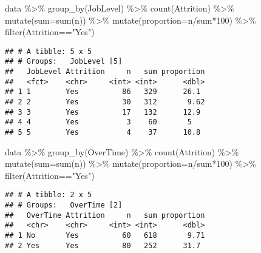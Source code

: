 \documentclass[
]{article}
\newenvironment{Shaded}{\begin{snugshade}}{\end{snugshade}}
\newcommand{\AttributeTok}[1]{\textcolor[rgb]{0.77,0.63,0.00}{#1}}
\newcommand{\DecValTok}[1]{\textcolor[rgb]{0.00,0.00,0.81}{#1}}
\newcommand{\FunctionTok}[1]{\textcolor[rgb]{0.00,0.00,0.00}{#1}}
\newcommand{\NormalTok}[1]{#1}
\newcommand{\SpecialCharTok}[1]{\textcolor[rgb]{0.00,0.00,0.00}{#1}}
\newcommand{\StringTok}[1]{\textcolor[rgb]{0.31,0.60,0.02}{#1}}
\begin{document}
\begin{Shaded}
\begin{Highlighting}[]
\NormalTok{data }\SpecialCharTok{\%\textgreater{}\%} \FunctionTok{group\_by}\NormalTok{(JobLevel) }\SpecialCharTok{\%\textgreater{}\%} 
  \FunctionTok{count}\NormalTok{(Attrition) }\SpecialCharTok{\%\textgreater{}\%} 
  \FunctionTok{mutate}\NormalTok{(}\AttributeTok{sum=}\FunctionTok{sum}\NormalTok{(n)) }\SpecialCharTok{\%\textgreater{}\%} 
  \FunctionTok{mutate}\NormalTok{(}\AttributeTok{proportion=}\NormalTok{n}\SpecialCharTok{/}\NormalTok{sum}\SpecialCharTok{*}\DecValTok{100}\NormalTok{) }\SpecialCharTok{\%\textgreater{}\%} 
  \FunctionTok{filter}\NormalTok{(Attrition}\SpecialCharTok{==}\StringTok{"Yes"}\NormalTok{)}
\end{Highlighting}
\end{Shaded}

\begin{verbatim}
## # A tibble: 5 x 5
## # Groups:   JobLevel [5]
##   JobLevel Attrition     n   sum proportion
##   <fct>    <chr>     <int> <int>      <dbl>
## 1 1        Yes          86   329      26.1 
## 2 2        Yes          30   312       9.62
## 3 3        Yes          17   132      12.9 
## 4 4        Yes           3    60       5   
## 5 5        Yes           4    37      10.8
\end{verbatim}

\begin{Shaded}
\begin{Highlighting}[]
\NormalTok{data }\SpecialCharTok{\%\textgreater{}\%} \FunctionTok{group\_by}\NormalTok{(OverTime) }\SpecialCharTok{\%\textgreater{}\%} 
  \FunctionTok{count}\NormalTok{(Attrition) }\SpecialCharTok{\%\textgreater{}\%} 
  \FunctionTok{mutate}\NormalTok{(}\AttributeTok{sum=}\FunctionTok{sum}\NormalTok{(n)) }\SpecialCharTok{\%\textgreater{}\%} 
  \FunctionTok{mutate}\NormalTok{(}\AttributeTok{proportion=}\NormalTok{n}\SpecialCharTok{/}\NormalTok{sum}\SpecialCharTok{*}\DecValTok{100}\NormalTok{) }\SpecialCharTok{\%\textgreater{}\%} 
  \FunctionTok{filter}\NormalTok{(Attrition}\SpecialCharTok{==}\StringTok{"Yes"}\NormalTok{)}
\end{Highlighting}
\end{Shaded}

\begin{verbatim}
## # A tibble: 2 x 5
## # Groups:   OverTime [2]
##   OverTime Attrition     n   sum proportion
##   <chr>    <chr>     <int> <int>      <dbl>
## 1 No       Yes          60   618       9.71
## 2 Yes      Yes          80   252      31.7
\end{verbatim}
\end{document}
